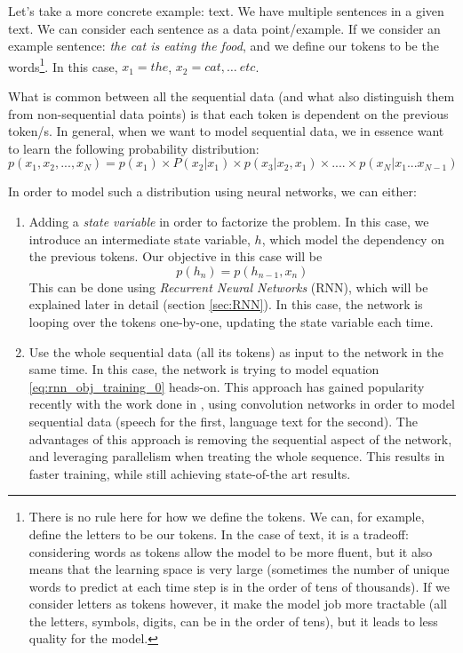 \par Let's take a more concrete example: text. We have multiple sentences in a given text. We can consider each sentence as a data point/example. If we consider an example sentence: \textit{the cat is eating the food}, and we define our tokens to be the words\footnote{There is no rule here for how we define the tokens. We can, for example, define the letters to be our tokens. In the case of text, it is a tradeoff: considering words as tokens allow the model to be more fluent, but it also means that the learning space is very large (sometimes the number of unique words to predict at each time step is in the order of tens of thousands). If we consider letters as tokens however, it make the model job more tractable (all the letters, symbols, digits, can be in the order of tens), but it leads to less quality for the model.}. In this case, $x_1=the$, $x_2=cat, \dots\ etc$.

\par What is common between all the sequential data (and what also distinguish them from non-sequential data points) is that each token is dependent on the previous token/s. In general, when we want to model sequential data, we in essence want to learn the following probability distribution:
\begin{equation}
    p(x_1, x_2, ..., x_N) = p(x_1) \times P(x_2|x_1) \times p(x_3|x_2, x_1) \times .... \times p(x_N|x_1 ... x_{N-1})
    \label{eq:rnn_obj_training_0}
\end{equation}

\par In order to model such a distribution using neural networks, we can either:
\begin{enumerate}
    \item Adding a \textit{state variable} in order to factorize the problem. In this case, we introduce an intermediate state variable, $h$, which model the dependency on the previous tokens. Our objective in this case will be
    \begin{equation}
        p(h_n) = p(h_{n-1}, x_{n})
        \label{eq:rnn_factorization}
    \end{equation}
    This can be done using \textit{Recurrent Neural Networks} (RNN), which will be explained later in detail (section \ref{sec:RNN}). In this case, the network is looping over the tokens one-by-one, updating the state variable each time.
    \item Use the whole sequential data (all its tokens) as input to the network in the same time. In this case, the network is trying to model equation \ref{eq:rnn_obj_training_0} heads-on. This approach has gained popularity recently with the work done in \citep{oord2016wavenet,gehring2017convolutional}, using convolution networks in order to model sequential data (speech for the first, language text for the second). The advantages of this approach is removing the sequential aspect of the network, and leveraging parallelism when treating the whole sequence. This results in faster training, while still achieving state-of-the art results.
\end{enumerate}

